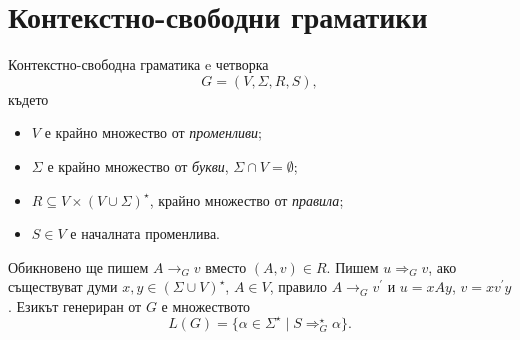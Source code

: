 \section{Контекстно-свободни граматики}
\begin{dfn}
  Контекстно-свободна граматика e четворка \[G = (V,\Sigma,R,S),\]
  където
  \begin{itemize}
  \item
    $V$ е крайно множество от {\em променливи};
  \item
    $\Sigma$ е крайно множество от {\em букви}, $\Sigma \cap V = \emptyset$;
  \item
    $R \subseteq V\times (V\cup\Sigma)^\star$, крайно множество от {\em правила};
  \item
    $S \in V$ е началната променлива. 
  \end{itemize}
  Обикновено ще пишем $A \rightarrow_G v$ вместо $(A,v) \in R$.
  Пишем $u \Rightarrow_G v$, ако съществуват думи $x,y\in (\Sigma\cup V)^\star$, $A\in V$,
  правило $A\rightarrow_G v^\prime$ и $u = xAy$, $v = xv^\prime y$.
  Езикът генериран от $G$ е множеството
  \[L(G) = \{\alpha\in\Sigma^\star\mid S \Rightarrow^\star_G \alpha\}.\]
\end{dfn}



